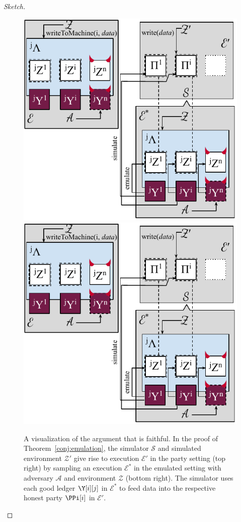 \begin{proof}[Sketch]
  \begin{figure}
    \centering
    \iftwocolumn
    \includegraphics[width=0.9 \columnwidth,keepaspectratio]{figures/rollerblade-emulation.pdf}
    \else
    \includegraphics[width=0.7 \columnwidth,keepaspectratio]{figures/rollerblade-emulation.pdf}
    \fi
    \caption{A visualization of the argument that \rollerblade is faithful.
    In the proof of Theorem~\ref{conj:emulation},
    the simulator $\mathcal{S}$ and simulated environment $\mathcal{Z}'$
    give rise to execution $\mathcal{E}'$ in the
    party setting (top right) by sampling an execution $\mathcal{E}^*$ in the emulated
    setting with adversary $\mathcal{A}$ and environment $\mathcal{Z}$
    (bottom right). The simulator uses each good ledger $\Y[i][j]$ in
    $\mathcal{E}^*$ to feed data into the respective honest party $\PPi[i]$
    in $\mathcal{E}'$. }
    \label{fig.conj.simulation}
  \end{figure}


\end{proof}
